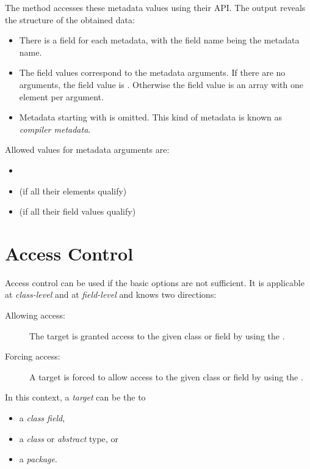 \documentclass{haxe}
\begin{document}
The  method accesses these metadata values using their API. The output reveals the structure of the obtained data:

\begin{itemize}
	\item There is a field for each metadata, with the field name being the metadata name.
	\item The field values correspond to the metadata arguments. If there are no arguments, the field value is . Otherwise the field value is an array with one element per argument.
	\item Metadata starting with \expr{:} is omitted. This kind of metadata is known as \emph{compiler metadata}.
\end{itemize}

Allowed values for metadata arguments are:

\begin{itemize}
	\item {}
	\item {} (if all their elements qualify)
	\item {} (if all their field values qualify)
\end{itemize}

\section{Access Control}
\label{lf-access-control}

Access control can be used if the basic  options are not sufficient. It is applicable at \emph{class-level} and at \emph{field-level} and knows two directions:

\begin{description}
	\item[Allowing access:] The target is granted access to the given class or field by using the  .
	\item[Forcing access:] A target is forced to allow access to the given class or field by using the  .
\end{description}

In this context, a \emph{target} can be the  to

\begin{itemize}
	\item a \emph{class field},
	\item a \emph{class} or \emph{abstract} type, or
	\item a \emph{package}.
\end{itemize}
\end{document}
